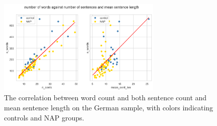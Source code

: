 \begin{figure}[ht!]
\begin{center}
    \includegraphics[width=0.7\textwidth]{Figures/chapter_4/de_n_words_n_sents.png} 
\caption[German Clinical Dataset: Length Characteristics]{\label{fig:data:de:length} The correlation between word count and both sentence count and mean sentence length on the German sample, with colors indicating controls and NAP groups.}
\end{center}
\end{figure}

